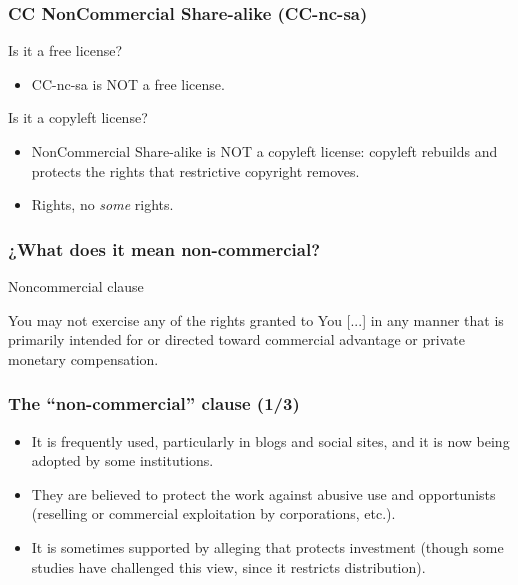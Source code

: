 \begin{frame}
\frametitle{CC NonCommercial Share-alike (CC-nc-sa)}

Is it a free license?
\pause

\begin{itemize}
\item CC-nc-sa is \alert{NOT} a free license.
\end{itemize}                                                 

\pause

Is it a copyleft license?
\pause

\begin{itemize}
\item NonCommercial Share-alike is \alert{NOT} a copyleft license: copyleft rebuilds and protects the rights that restrictive copyright removes.
\item Rights, no \textit{some} rights.
\end{itemize}                                                 

\end{frame}



\begin{frame}
\frametitle{¿What does it mean non-commercial?}

\begin{block}{Noncommercial clause}
\small

You may not exercise any of the rights granted to You [...] in any manner that is primarily intended for or directed toward commercial advantage or private monetary compensation. 



\end{block}

\end{frame}



\begin{frame}
\frametitle{The ``non-commercial'' clause (1/3)}

\begin{itemize}
\item It is frequently used, particularly in blogs and social sites, and it is now being adopted by some institutions.
\item They are believed to protect the work against abusive use and opportunists (reselling or commercial exploitation by corporations, etc.).
\item It is sometimes supported by alleging that protects investment (though some studies have challenged this view, since it restricts distribution).
\end{itemize}                                                 

\end{frame}

